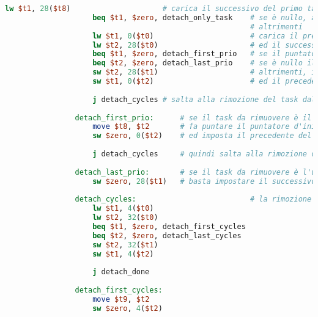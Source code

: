 \begin{center}
\begin{lstlisting}[language=mips, gobble=14, stepnumber=1]
                    lw $t1, 28($t8)                     # carica il successivo del primo task nella lista A
                    beq $t1, $zero, detach_only_task    # se è nullo, allora c'è un solo task nella coda (rimuoverlo equivale a svuotare la coda)
                                                        # altrimenti
                    lw $t1, 0($t0)                      # carica il precedente del task da rimuovere
                    lw $t2, 28($t0)                     # ed il successivo
                    beq $t1, $zero, detach_first_prio   # se il puntatore al precedente è nullo, allora è da rimuovere il primo task della lista A
                    beq $t2, $zero, detach_last_prio    # se è nullo il puntatore al successivo, allora è l'ultimo
                    sw $t2, 28($t1)                     # altrimenti, imposta il successivo come successivo del precedente
                    sw $t1, 0($t2)                      # ed il precedente come precedente del successivo
                    
                    j detach_cycles # salta alla rimozione del task dalla lista B
                    
                detach_first_prio:      # se il task da rimuovere è il primo della lista A
                    move $t8, $t2       # fa puntare il puntatore d'inizio di A al task successivo (ovvero il secondo)
                    sw $zero, 0($t2)    # ed imposta il precedente del successivo come puntatore nullo
                    
                    j detach_cycles     # quindi salta alla rimozione dalla lista B
                    
                detach_last_prio:       # se il task da rimuovere è l'ultimo della lista A
                    sw $zero, 28($t1)   # basta impostare il successivo del task precedente come puntatore nullo
                    
                detach_cycles:                          # la rimozione dalla lista B è del tutto analoga a quella della lista A
                    lw $t1, 4($t0)
                    lw $t2, 32($t0)
                    beq $t1, $zero, detach_first_cycles
                    beq $t2, $zero, detach_last_cycles
                    sw $t2, 32($t1)
                    sw $t1, 4($t2)
                    
                    j detach_done
                    
                detach_first_cycles:
                    move $t9, $t2
                    sw $zero, 4($t2)
                    

\end{lstlisting}
\end{center}
